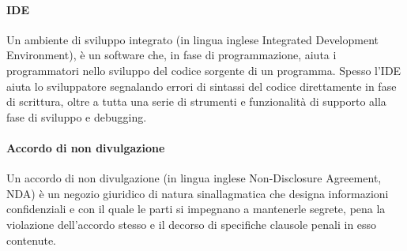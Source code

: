 \paragraph{IDE}
\label{IDE}
Un ambiente di sviluppo integrato (in lingua inglese Integrated Development Environment), è un software che, in fase di programmazione, aiuta i programmatori nello sviluppo del codice sorgente di un programma. 
Spesso l'IDE aiuta lo sviluppatore segnalando errori di sintassi del codice direttamente in fase di scrittura, oltre a tutta una serie di strumenti e funzionalità di supporto alla fase di sviluppo e debugging.

\paragraph{Accordo di non divulgazione}
\label{NDA}
Un accordo di non divulgazione (in lingua inglese Non-Disclosure Agreement, NDA) è un negozio giuridico di natura sinallagmatica che designa informazioni confidenziali e con il quale le parti si impegnano a mantenerle segrete, pena la violazione dell'accordo stesso e il decorso di specifiche clausole penali in esso contenute.



